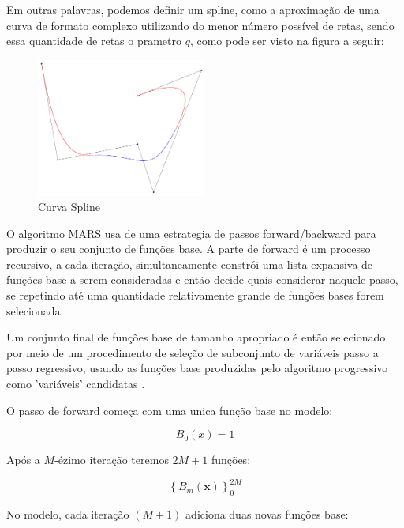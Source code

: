 \documentclass[
	12pt,				%
	openright,			%
	oneside,			%
	a4paper,			%
	english,			%
	brazil				%
	]{abntex2}
\begin{document}
Em outras palavras, podemos definir um spline, como a aproximação de uma curva de formato complexo utilizando do 
menor número possível de retas, sendo essa quantidade de retas o prametro $q$, como pode ser visto na figura a seguir:

\begin{figure}[H]
    \centering
    \caption{\label{Curva Spline}Curva Spline}
    \includegraphics[width=0.50\textwidth]{../Imgs/B-spline_curve.png}
\end{figure}

O algoritmo MARS usa de uma estrategia de passos forward/backward para produzir o seu conjunto de funções base. A parte de forward é um
processo recursivo, a cada iteração, simultaneamente constrói uma lista expansiva de funções base a serem consideradas e então decide 
quais considerar naquele passo, se repetindo até uma quantidade relativamente grande de funções bases forem selecionada. 

Um conjunto final de funções base de tamanho apropriado é então selecionado por meio de um procedimento de seleção de subconjunto de 
variáveis passo a passo regressivo, usando as funções base produzidas pelo algoritmo progressivo como 'variáveis' 
candidatas \cite{intro_mars}.

O passo de forward começa com uma unica função base no modelo:

\begin{equation}
	\label{inicio_funcao_base}
	B_0(x) = 1
\end{equation}

Após a $M$-ézimo iteração teremos $2M+1$ funções:

\begin{equation}
	\label{funcao_base}
	\left\{B_m(\mathbf{x})\right\}_{0}^{2M}
\end{equation}

No modelo, cada iteração $(M + 1)$ adiciona duas novas funções base:
\end{document}
